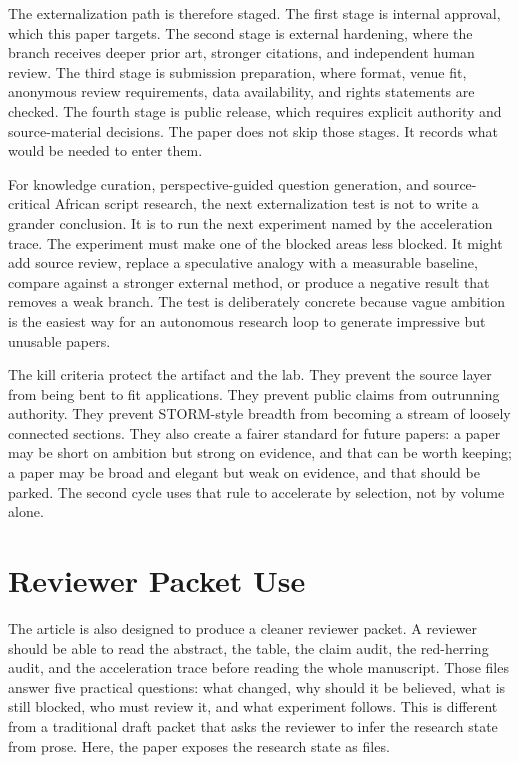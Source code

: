 \documentclass[sigconf,nonacm]{acmart}
\begin{document}
The externalization path is therefore staged. The first stage is internal
approval, which this paper targets. The second stage is external hardening, where
the branch receives deeper prior art, stronger citations, and independent human
review. The third stage is submission preparation, where format, venue fit,
anonymous review requirements, data availability, and rights statements are
checked. The fourth stage is public release, which requires explicit authority
and source-material decisions. The paper does not skip those stages. It records
what would be needed to enter them.

For knowledge curation, perspective-guided question generation, and source-critical African script research, the next externalization test is not to write a grander conclusion.
It is to run the next experiment named by the acceleration trace. The experiment
must make one of the blocked areas less blocked. It might add source review,
replace a speculative analogy with a measurable baseline, compare against a
stronger external method, or produce a negative result that removes a weak
branch. The test is deliberately concrete because vague ambition is the easiest
way for an autonomous research loop to generate impressive but unusable papers.

The kill criteria protect the artifact and the lab. They prevent the source
layer from being bent to fit applications. They prevent public claims from
outrunning authority. They prevent STORM-style breadth from becoming a stream of
loosely connected sections. They also create a fairer standard for future
papers: a paper may be short on ambition but strong on evidence, and that can be
worth keeping; a paper may be broad and elegant but weak on evidence, and that
should be parked. The second cycle uses that rule to accelerate by selection,
not by volume alone.

\section{Reviewer Packet Use}
The article is also designed to produce a cleaner reviewer packet. A reviewer
should be able to read the abstract, the table, the claim audit, the red-herring
audit, and the acceleration trace before reading the whole manuscript. Those
files answer five practical questions: what changed, why should it be believed,
what is still blocked, who must review it, and what experiment follows. This is
different from a traditional draft packet that asks the reviewer to infer the
research state from prose. Here, the paper exposes the research state as files.
\end{document}
